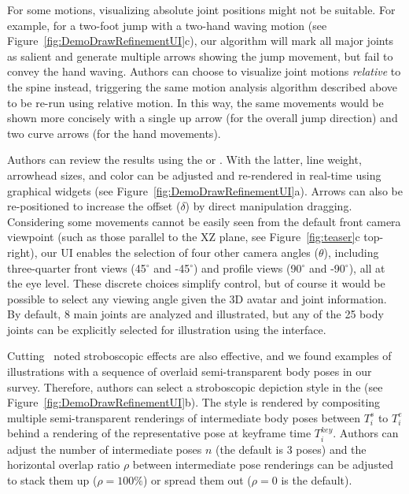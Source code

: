For some motions, visualizing absolute joint positions might not be suitable.
For example, for a two-foot jump with a two-hand waving motion (see Figure~\ref{fig:DemoDrawRefinementUI}c), our algorithm will mark all major joints as salient and generate multiple arrows showing the jump movement, but fail to convey the hand waving.
%
Authors can choose to visualize joint motions \textit{relative} to the spine instead,
triggering the same motion analysis algorithm described above to be re-run using relative motion.
In this way, the same movements would be shown more concisely with a single up arrow (for the overall jump direction) and two curve arrows (for the hand movements).

Authors can review the results using the \phaseI{} or \phaseII{}. With the latter, line weight, arrowhead sizes, and color can be adjusted and re-rendered in real-time using graphical widgets (see Figure~\ref{fig:DemoDrawRefinementUI}a). Arrows can also be re-positioned to increase the offset ($\delta$) by direct manipulation dragging.
%
Considering some movements cannot be easily seen from the default front camera viewpoint (such as those parallel to the XZ plane, see Figure~\ref{fig:teaser}c top-right), our UI enables the selection of four other camera angles ($\theta$), including three-quarter front views (45$^{\circ}$ and -45$^{\circ}$) and profile views (90$^{\circ}$ and -90$^{\circ}$), all at the eye level. These discrete choices simplify control, but of course it would be possible to select any viewing angle given the 3D avatar and joint information. By default, 8 main joints are analyzed and illustrated, but any of the 25 body joints can be explicitly selected for illustration using the interface.

Cutting~\cite{cutting_representing_2002} noted stroboscopic effects are also effective, and we found examples of illustrations with a sequence of overlaid semi-transparent body poses in our survey.
%
Therefore, authors can select a stroboscopic depiction style in the \phaseII{} (see Figure~\ref{fig:DemoDrawRefinementUI}b).
The style is rendered by compositing multiple semi-transparent renderings of intermediate body poses between $T_i^s$ to $T_i^e$ behind a rendering of the representative pose at keyframe time $T_i^{key}$.
Authors can adjust the number of intermediate poses $n$ (the default is 3 poses) and the horizontal overlap ratio $\rho$ between intermediate pose renderings can be adjusted to stack them up ($\rho=100\%$) or spread them out ($\rho=0$ is the default).

